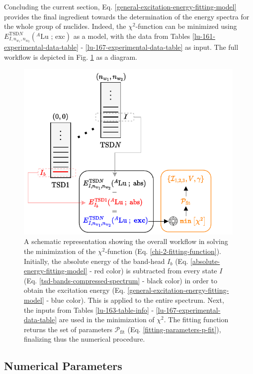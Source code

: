 Concluding the current section, Eq. \ref{general-excitation-energy-fitting-model} provides the final ingredient towards the determination of the energy spectra for the whole group of nuclides. Indeed, the $\chi^2$-function can be minimized using $E_{I,n_{w_1},n_{w_2}}^{\text{TSD}N}(^A\text{Lu\ ;\ exc})$ as a model, with the data from Tables \ref{lu-161-experimental-data-table} - \ref{lu-167-experimental-data-table} as input. The full workflow is depicted in Fig. \ref{fitting-workflow-fig} as a diagram.
\begin{figure}
    \centering
    \includegraphics[width=0.99\textwidth]{Chapters/Figures/fitting_procedure_chi2.pdf}
    \caption{A schematic representation showing the overall workflow in solving the minimization of the $\chi^2$-function (Eq. \ref{chi-2-fitting-function}). Initially, the absolute energy of the band-head $I_b$ (Eq. \ref{absolute-energy-fitting-model} - red color) is subtracted from every state $I$ (Eq. \ref{tsd-bands-compressed-spectrum} - black color) in order to obtain the excitation energy (Eq. \ref{general-excitation-energy-fitting-model} - blue color). This is applied to the entire spectrum. Next, the inputs from Tables \ref{lu-163-table-info} - \ref{lu-167-experimental-data-table} are used in the minimization of $\chi^2$. The fitting function returns the set of parameters $\mathcal{P}_\text{fit}$ (Eq. \ref{fitting-parameters-p-fit}), finalizing thus the numerical procedure.}
    \label{fitting-workflow-fig}
\end{figure}

\subsection{Numerical Parameters}

